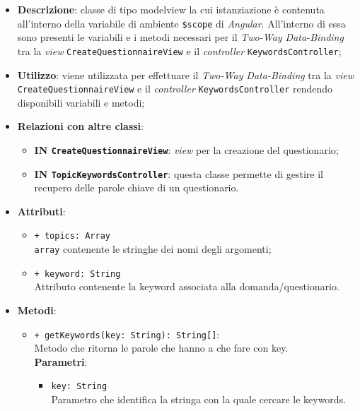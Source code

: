 				\begin{itemize}
					\item \textbf{Descrizione}: classe di tipo modelview la cui istanziazione è contenuta all'interno della variabile di ambiente \texttt{\$scope} di \textit{Angular}. All'interno di essa sono presenti le variabili e i metodi necessari per il \textit{Two-Way Data-Binding\ped{G}} tra la \textit{view} \texttt{CreateQuestionnaireView} e il \textit{controller} \texttt{KeywordsController};
					\item \textbf{Utilizzo}: viene utilizzata per effettuare il \textit{Two-Way Data-Binding\ped{G}} tra la \textit{view}\\ \texttt{CreateQuestionnaireView} e il \textit{controller} \texttt{KeywordsController} rendendo disponibili variabili e metodi;
					\item \textbf{Relazioni con altre classi}: 
					\begin{itemize}
						\item \textbf{IN \texttt{CreateQuestionnaireView}}: \textit{view} per la creazione del questionario; 
						\item \textbf{IN \texttt{TopicKeywordsController}}: questa classe permette di gestire il recupero delle parole chiave di un questionario.
					\end{itemize}
					\item \textbf{Attributi}: 
					\begin{itemize}
						\item \texttt{+ topics: Array} \\ \texttt{array} contenente le stringhe dei nomi degli argomenti;
						\item \texttt{+ keyword: String} \\ Attributo contenente la keyword associata alla domanda/questionario.
					\end{itemize}
					\item \textbf{Metodi}: 
					\begin{itemize}
						\item \texttt{+ getKeywords(key: String): String[]}: \\ Metodo che ritorna le parole che hanno a che fare con key.\\						
						\textbf{Parametri}:
						\begin{itemize}
							\item \texttt{key: String}\\
							Parametro che identifica la stringa con la quale cercare le keywords. 
						\end{itemize}
					\end{itemize}
				\end{itemize}
				
					